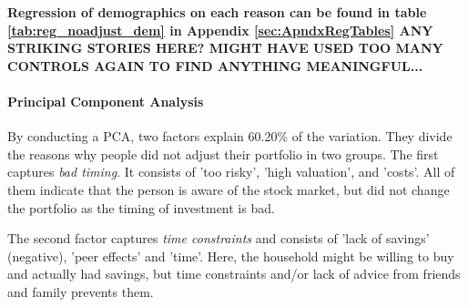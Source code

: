 \documentclass[ProjectABM]{subfiles}
\begin{document}
\textbf{Regression of demographics on each reason can be found in table \ref{tab:reg_noadjust_dem} in Appendix \ref{sec:ApndxRegTables} ANY STRIKING STORIES HERE? MIGHT HAVE USED TOO MANY CONTROLS AGAIN TO FIND ANYTHING MEANINGFUL...}





\paragraph{Principal Component Analysis}
By conducting a PCA, two factors explain 60.20\% of the variation. They divide the reasons why people did not adjust their portfolio in two groups. The first captures \textit{bad timing}. It consists of 'too risky', 'high valuation', and 'costs'. All of them indicate that the person is aware of the stock market, but did not change the portfolio as the timing of investment is bad. %

The second factor captures \textit{time constraints} and consists of 'lack of savings' (negative), 'peer effects' and 'time'. Here, the household might be willing to buy and actually had savings, but time constraints and/or lack of advice from friends and family prevents them.
\end{document}
